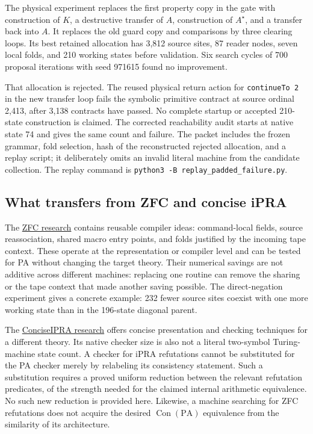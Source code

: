 The physical experiment replaces the first property copy in the gate
with construction of $K$, a destructive transfer of $A$, construction
of $A^\star$, and a transfer back into $A$.  It replaces the old guard
copy and comparisons by three clearing loops.  Its best retained
allocation has 3,812 source sites, 87 reader nodes, seven local folds,
and 210 working states before validation.  Six search cycles of 700
proposal iterations with seed 971615 found no improvement.

That allocation is rejected.  The reused physical return action for
\texttt{continueTo 2} in the new transfer loop fails the symbolic
primitive contract at source ordinal 2,413, after 3,138 contracts have
passed.  No complete startup or accepted 210-state construction is
claimed.  The corrected reachability audit starts at native state 74
and gives the same count and failure.  The packet includes the frozen
grammar, fold selection, hash of the reconstructed rejected allocation,
and a replay script; it deliberately omits an invalid literal machine
from the candidate collection.  The replay command is
\texttt{python3 -B replay\_padded\_failure.py}.

\subsection{What transfers from ZFC and concise iPRA}

The
\href{https://github.com/VladimirReshetnikov/ProveIt/tree/906367250a7f96c923147b10df392294bced7be5/Computability/BusyBeaver/Research/ZFC}{ZFC research}
contains reusable compiler ideas: command-local fields, source
reassociation, shared macro entry points, and folds justified by the
incoming tape context.  These operate at the representation or compiler
level and can be tested for PA without changing the target theory.
Their numerical savings are not additive across different machines:
replacing one routine can remove the sharing or the tape context that
made another saving possible.  The direct-negation experiment gives a
concrete example: 232 fewer source sites coexist with one more working
state than in the 196-state diagonal parent.

The
\href{https://github.com/VladimirReshetnikov/ProveIt/tree/906367250a7f96c923147b10df392294bced7be5/Logic/PrimitiveRecursiveArithmetic/ConciseIPRA}{ConciseIPRA research}
offers concise presentation and checking techniques for a different
theory.  Its native checker size is also not a literal two-symbol
Turing-machine state count.  A checker for iPRA refutations cannot be
substituted for the PA checker merely by relabeling its consistency
statement.  Such a substitution requires a proved uniform reduction
between the relevant refutation predicates, of the strength needed for
the claimed internal arithmetic equivalence.  No such new reduction is
provided here.  Likewise, a machine searching for ZFC refutations does
not acquire the desired $\operatorname{Con}(\mathrm{PA})$ equivalence
from the similarity of its architecture.


